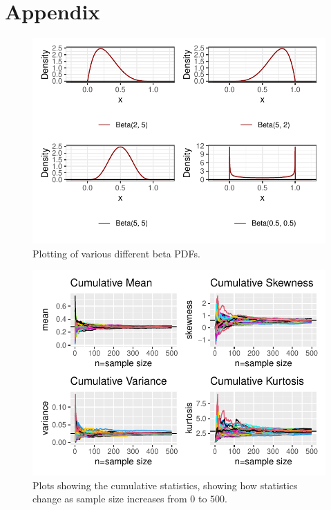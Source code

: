 \documentclass{article}\usepackage[]{graphicx}\usepackage[]{xcolor}
\makeatletter
\def\maxwidth{ %
  \ifdim\Gin@nat@width>\linewidth
    \linewidth
  \else
    \Gin@nat@width
  \fi
}
\newenvironment{knitrout}{}{} %
\makeatother
\begin{document}
\newpage
\onecolumn
\section{Appendix}
 \begin{figure}[H]
 \begin{center}
\begin{knitrout}
\color{fgcolor}
\includegraphics[width=\maxwidth]{figure/unnamed-chunk-2-1} 
\end{knitrout}
 \caption{Plotting of various different beta PDFs.}
 \label{plot1} %
 \end{center}
 \end{figure}

\begin{figure}[H]
 \begin{center}
\begin{knitrout}
\color{fgcolor}
\includegraphics[width=\maxwidth]{figure/unnamed-chunk-3-1} 
\end{knitrout}
 \caption{Plots showing the cumulative statistics, showing how statistics change as sample size increases from $0$ to $500$.}
 \label{plot3} %
 \end{center}
 \end{figure}
\end{document}
